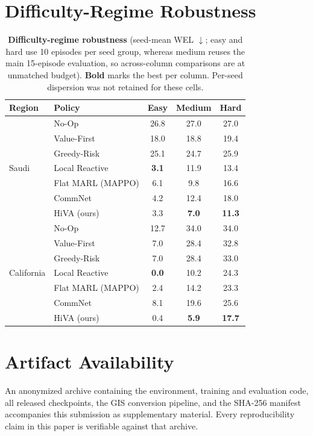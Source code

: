 \documentclass[letterpaper]{article}
\begin{document}
\section{Difficulty-Regime Robustness}
\label{app:robustness}

\begin{table}[H]
	\centering
	\caption{\textbf{Difficulty-regime robustness} (seed-mean WEL $\downarrow$; easy and hard use 10 episodes per seed group, whereas medium reuses the main 15-episode evaluation, so across-column comparisons are at unmatched budget). \textbf{Bold} marks the best per column. Per-seed dispersion was not retained for these cells.}
	\label{tab:robustness}
	\vspace{0.4em}
	\setlength{\tabcolsep}{4pt}\small
	\begin{tabular}{llccc}
		\toprule
		Region & Policy & Easy & Medium & Hard \\
		\midrule
		\multirow{7}{*}{Saudi}
		& No-Op & 26.8 & 27.0 & 27.0 \\
		& Value-First & 18.0 & 18.8 & 19.4 \\
		& Greedy-Risk & 25.1 & 24.7 & 25.9 \\
		& Local Reactive & \textbf{3.1} & 11.9 & 13.4 \\
		& Flat MARL (MAPPO) & 6.1 & 9.8 & 16.6 \\
		& CommNet & 4.2 & 12.4 & 18.0 \\
		& HiVA (ours) & 3.3 & \textbf{7.0} & \textbf{11.3} \\
		\midrule
		\multirow{7}{*}{California}
		& No-Op & 12.7 & 34.0 & 34.0 \\
		& Value-First & 7.0 & 28.4 & 32.8 \\
		& Greedy-Risk & 7.0 & 28.4 & 33.0 \\
		& Local Reactive & \textbf{0.0} & 10.2 & 24.3 \\
		& Flat MARL (MAPPO) & 2.4 & 14.2 & 23.3 \\
		& CommNet & 8.1 & 19.6 & 25.6 \\
		& HiVA (ours) & 0.4 & \textbf{5.9} & \textbf{17.7} \\
		\bottomrule
	\end{tabular}
\end{table}

\section{Artifact Availability}
\label{app:artifact}

An anonymized archive containing the environment, training and evaluation code, all released checkpoints, the GIS conversion pipeline, and the SHA-256 manifest accompanies this submission as supplementary material. Every reproducibility claim in this paper is verifiable against that archive.


\end{document}
